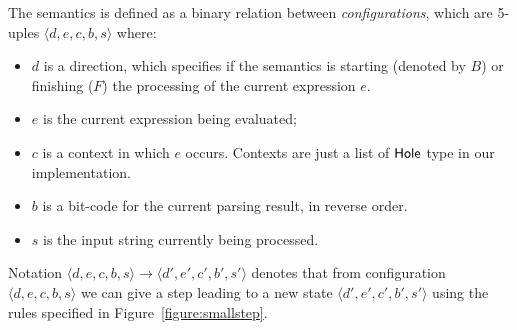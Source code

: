 \documentclass[oneside,12pt]{scrbook}
\theoremstyle{definition}
\newcommand{\D}[1]{\blue{\mathsf{#1}}}
\newcommand{\conf}[1]{\ensuremath{\langle #1 \rangle}}
\theoremstyle{plain}
\theoremstyle{definition}
\begin{document}
The semantics is defined as a binary relation between \emph{configurations}, which are 5-uples
$\conf{d,e,c,b,s}$ where:
\begin{itemize}
	\item $d$ is a direction, which specifies if the semantics is starting (denoted by $B$) or
	finishing ($F$) the processing of the current expression $e$.
	\item $e$ is the current expression being evaluated;
	\item $c$ is a context in which $e$ occurs. Contexts are just a list of
	\ensuremath{\D{Hole}} type in our implementation.
	\item $b$ is a bit-code for the current parsing result, in reverse order.
	\item $s$ is the input string currently being processed.
\end{itemize}
Notation $\conf{d,e,c,b,s}\to\conf{d',e',c',b',s'}$ denotes that from
configuration $\conf{d,e,c,b,s}$ we can give a step leading to a new state
$\conf{d',e',c',b',s'}$ using the rules specified in Figure~\ref{figure:smallstep}.
\end{document}
